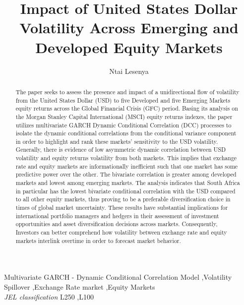 \documentclass[11pt,preprint, authoryear]{elsarticle}
\numberwithin{equation}{section}
\numberwithin{figure}{section}
\numberwithin{table}{section}
\begin{document}
\begin{frontmatter}  %

\title{Impact of United States Dollar Volatility Across Emerging and Developed
Equity Markets}





\author[Add1]{Ntai Lesenya}





\address[Add1]{22356258}
\address[Add2]{DEPARTMENT OF ECONOMICS}
\address[Add3]{STELLENBOSCH UNIVERSITY}


\begin{abstract}
\small{
The paper seeks to assess the presence and impact of a unidirectional
flow of volatility from the United States Dollar (USD) to five Developed
and five Emerging Markets equity returns across the Global Financial
Crisis (GFC) period. Basing its analysis on the Morgan Stanley Capital
International (MSCI) equity returns indexes, the paper utilizes
multivariate GARCH Dynamic Conditional Correlation (DCC) processes to
isolate the dynamic conditional correlations from the conditional
variance component in order to highlight and rank these markets'
sensitivity to the USD volatility. Generally, there is evidence of low
asymmetric dynamic correlation between USD volatility and equity returns
volatility from both markets. This implies that exchange rate and equity
markets are informationally inefficient such that one market has some
predictive power over the other. The bivariate correlation is greater
among developed markets and lowest among emerging markets. The analysis
indicates that South Africa in particular has the lowest bivariate
conditional correlation with the USD compared to all other equity
markets, thus proving to be a preferable diversification choice in times
of global market uncertainty. These results have substantial
implications for international portfolio managers and hedgers in their
assessment of investment opportunities and asset diversification
decisions across markets. Consequently, Investors can better comprehend
how volatility between exchange rate and equity markets interlink
overtime in order to forecast market behavior.
}
\end{abstract}

\vspace{1cm}

\begin{keyword}
\footnotesize{
Multivariate GARCH - Dynamic Conditional Correlation Model
\sep Volatility Spillover \sep Exchange Rate market \sep Equity Markets \\ \vspace{0.3cm}
\textit{JEL classification} L250 \sep L100
}
\end{keyword}
\vspace{0.5cm}
\end{frontmatter}
\end{document}
